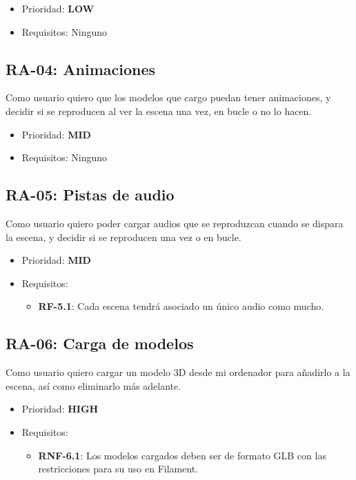 \begin{itemize}
    \item Prioridad: \textbf{LOW}
    \item Requisitos: Ninguno
\end{itemize}

\subsection{RA-04: Animaciones}
Como usuario quiero que los modelos que cargo puedan tener animaciones, y decidir si se reproducen al ver la escena una vez, en bucle o no lo hacen.

\begin{itemize}
    \item Prioridad: \textbf{MID}
    \item Requisitos: Ninguno
\end{itemize}

\subsection{RA-05: Pistas de audio}
Como usuario quiero poder cargar audios que se reproduzcan cuando se dispara la escena, y decidir si se reproducen una vez o en bucle.

\begin{itemize}
    \item Prioridad: \textbf{MID}
    \item Requisitos:
            \begin{itemize}
                \item \textbf{RF-5.1}: Cada escena tendrá asociado un único audio como mucho.
            \end{itemize}
\end{itemize}

\subsection{RA-06: Carga de modelos}
Como usuario quiero cargar un modelo 3D desde mi ordenador para añadirlo a la escena, así como eliminarlo más adelante.

\begin{itemize}
    \item Prioridad: \textbf{HIGH}
    \item Requisitos:
            \begin{itemize}
                \item \textbf{RNF-6.1}: Los modelos cargados deben ser de formato GLB con las restricciones para su uso en Filament.
            \end{itemize}
\end{itemize}

